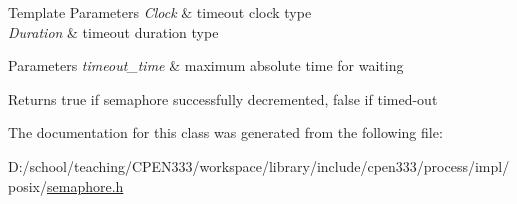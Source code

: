 \begin{DoxyTemplParams}{Template Parameters}
{\em Clock} & timeout clock type \\
\hline
{\em Duration} & timeout duration type \\
\hline
\end{DoxyTemplParams}

\begin{DoxyParams}{Parameters}
{\em timeout\+\_\+time} & maximum absolute time for waiting \\
\hline
\end{DoxyParams}
\begin{DoxyReturn}{Returns}
true if semaphore successfully decremented, false if timed-\/out 
\end{DoxyReturn}


The documentation for this class was generated from the following file\+:\begin{DoxyCompactItemize}
\item 
D\+:/school/teaching/\+C\+P\+E\+N333/workspace/library/include/cpen333/process/impl/posix/\hyperlink{process_2impl_2posix_2semaphore_8h}{semaphore.\+h}\end{DoxyCompactItemize}
